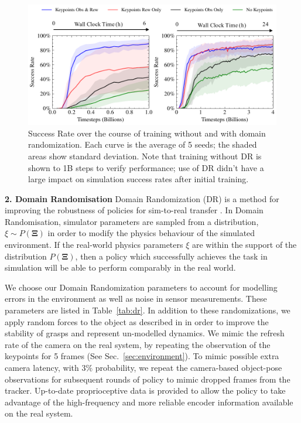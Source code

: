 \documentclass[letterpaper, 10 pt, conference]{ieeeconf}  %
\newcommand{\secref}[1]{Sec.~\ref{#1}}
\newcommand{\tabref}[1]{Table~\ref{#1}}
\begin{document}
\begin{figure}[t]
\begin{minipage}[c]{0.69\textwidth}
  \centering
  \includegraphics[width=\linewidth]{figure/exp2/training_nodr+dr_clock.pdf}
  \centerline{
    \hfill
    }
\end{minipage}
\begin{minipage}[c]{0.25\textwidth}
\centering
\caption{\small
Success Rate over the course of training without and with domain randomization. Each curve is the average of 5 seeds; the shaded areas show standard deviation. Note that training without DR is shown to 1B steps to verify performance; use of DR didn't have a large impact on simulation success rates after initial training.}
\label{fig:exp2}
  \end{minipage}
\end{figure}

\noindent \textbf{2. Domain Randomisation} Domain Randomization (DR) is a method for improving the robustness of policies for sim-to-real transfer \citep{openai-dr,Jason:ICRA:2018,mandlekar2017arpl}. In Domain Randomisation, simulator parameters are sampled from a distribution, $\xi \sim P(\mathbf{\Xi})$ in order to modify the physics behaviour of the simulated environment. If the real-world physics parameters $\xi$ are within the support of the distribution $P(\mathbf{\Xi})$, then a policy which successfully achieves the task in simulation will be able to perform comparably in the real world.

We choose our Domain Randomization parameters to account for modelling errors in the environment as well as noise in sensor measurements. These parameters are listed in \tabref{tab:dr}. In addition to these randomizations, we apply random forces to the object as described in \citep{openai-sh} in order to improve the stability of grasps and represent un-modelled dynamics. We mimic the refresh rate of the camera on the real system, by repeating the observation of the keypoints for 5 frames (See \secref{sec:environment}). To mimic possible extra camera latency, with $3\%$ probability, we repeat the camera-based object-pose observations for subsequent rounds of policy to mimic dropped frames from the tracker. Up-to-date proprioceptive data is provided to allow the policy to take advantage of the high-frequency and more reliable encoder information available on the real system.
\end{document}
